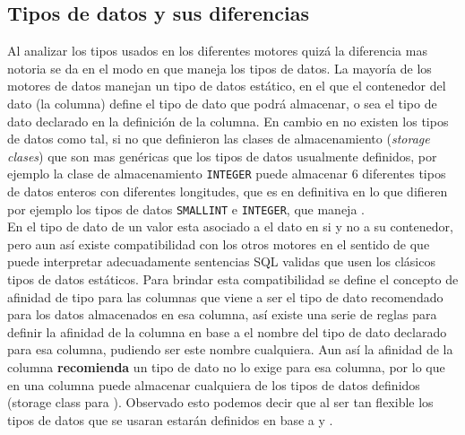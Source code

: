 \subsection{Tipos de datos y sus diferencias}
\label{subsection:datatypes}
Al analizar los tipos usados en los diferentes motores quizá la diferencia mas notoria se da en el modo en que \s maneja los tipos de datos. La mayoría de los motores de datos manejan un tipo de datos estático, en el que el contenedor del dato (la columna) define el tipo de dato que podrá almacenar, o sea el tipo de dato declarado en la definición de la columna. En cambio en \s no existen los tipos de datos como tal, si no que definieron las clases de almacenamiento\cite{sqlite:datatypes} (\textit{storage clases}) que son mas genéricas que los tipos de datos usualmente definidos, por ejemplo la clase de almacenamiento \verb=INTEGER= puede almacenar 6 diferentes tipos de datos enteros con diferentes longitudes, que es en definitiva en lo que difieren por ejemplo los tipos de datos \verb=SMALLINT= e \verb=INTEGER=, que maneja \m.\\

 En \s el tipo de dato de un valor esta asociado a el dato en si y no a su contenedor, pero aun así existe compatibilidad con los otros motores en el sentido de que \s puede interpretar adecuadamente sentencias SQL validas que usen los clásicos tipos de datos estáticos. Para brindar esta compatibilidad se define el concepto de afinidad de tipo para las columnas que viene a ser el tipo de dato recomendado para los datos almacenados en esa columna, así existe una serie de reglas para definir la afinidad de la columna en base a el nombre del tipo de dato declarado para esa columna, pudiendo ser este nombre cualquiera. Aun así la afinidad de la columna \textbf{recomienda} un tipo de dato no lo exige para esa columna, por lo que en \s una columna puede almacenar cualquiera de los tipos de datos definidos (storage class para \s). Observado esto podemos decir que al ser \s tan flexible los tipos de datos que se usaran estarán definidos en base a \m y \p.\\
 
